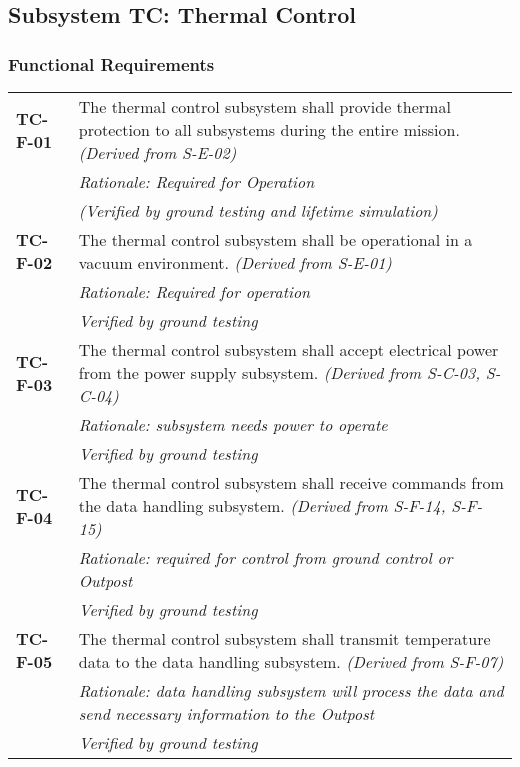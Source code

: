 \subsection{Subsystem TC: Thermal Control}
\label{req_TC}
\subsubsection*{Functional Requirements}
\vspace{-15pt}
\begin{longtable}{P{2cm}P{13.25cm}}
\textbf{TC-F-01}	&
The thermal control subsystem shall provide thermal protection to all subsystems during the entire mission.
\textit{(Derived from S-E-02)} \\
& \textit{Rationale: Required for Operation} \\
& \textit{(Verified by ground testing and lifetime simulation)}	\\

\textbf{TC-F-02}	&
The thermal control subsystem shall be operational in a vacuum environment.
\textit{(Derived from S-E-01)}\\
& \textit{Rationale: Required for operation}	\\
& \textit{Verified by ground testing}	\\

\textbf{TC-F-03}	& The thermal control subsystem shall accept electrical power from the power supply subsystem. \textit{(Derived from S-C-03, S-C-04)}	\\
& \textit{Rationale: subsystem needs power to operate}	\\
& \textit{Verified by ground testing}	\\

\textbf{TC-F-04}	& The thermal control subsystem shall receive commands from the data handling subsystem.
\textit{(Derived from S-F-14, S-F-15)} \\
 & \textit{Rationale: required for control from ground control or Outpost} \\
 & \textit{Verified by ground testing}		\\

\textbf{TC-F-05}	& The thermal control subsystem shall transmit temperature data to the data handling subsystem. \textit{(Derived from S-F-07)} \\
 & \textit{Rationale: data handling subsystem will process the data and send necessary information to the Outpost} \\
  & \textit{Verified by ground testing}			\\


\end{longtable}
